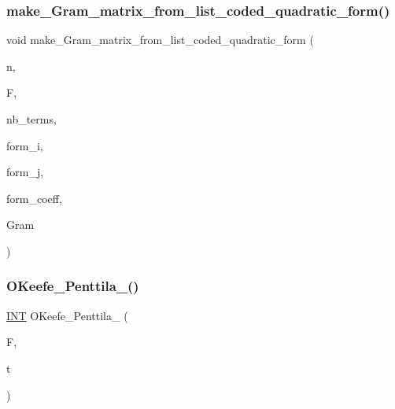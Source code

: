 \subsubsection{\texorpdfstring{make\+\_\+\+Gram\+\_\+matrix\+\_\+from\+\_\+list\+\_\+coded\+\_\+quadratic\+\_\+form()}{make\_Gram\_matrix\_from\_list\_coded\_quadratic\_form()}}
{\footnotesize\ttfamily void make\+\_\+\+Gram\+\_\+matrix\+\_\+from\+\_\+list\+\_\+coded\+\_\+quadratic\+\_\+form (\begin{DoxyParamCaption}\item[{\mbox{\hyperlink{galois_8h_a09fddde158a3a20bd2dcadb609de11dc}{I\+NT}}}]{n,  }\item[{\mbox{\hyperlink{classfinite__field}{finite\+\_\+field}} \&}]{F,  }\item[{\mbox{\hyperlink{galois_8h_a09fddde158a3a20bd2dcadb609de11dc}{I\+NT}}}]{nb\+\_\+terms,  }\item[{\mbox{\hyperlink{galois_8h_a09fddde158a3a20bd2dcadb609de11dc}{I\+NT}} $\ast$}]{form\+\_\+i,  }\item[{\mbox{\hyperlink{galois_8h_a09fddde158a3a20bd2dcadb609de11dc}{I\+NT}} $\ast$}]{form\+\_\+j,  }\item[{\mbox{\hyperlink{galois_8h_a09fddde158a3a20bd2dcadb609de11dc}{I\+NT}} $\ast$}]{form\+\_\+coeff,  }\item[{\mbox{\hyperlink{galois_8h_a09fddde158a3a20bd2dcadb609de11dc}{I\+NT}} $\ast$}]{Gram }\end{DoxyParamCaption})}

\mbox{\label{data_8_c_a30ac3b374e7cac53bd723d0826457ddf}} 
\subsubsection{\texorpdfstring{O\+Keefe\+\_\+\+Penttila\+\_()}{OKeefe\_Penttila\_32()}}
{\footnotesize\ttfamily \mbox{\hyperlink{galois_8h_a09fddde158a3a20bd2dcadb609de11dc}{I\+NT}} O\+Keefe\+\_\+\+Penttila\+\_ (\begin{DoxyParamCaption}\item[{\mbox{\hyperlink{classfinite__field}{finite\+\_\+field}} $\ast$}]{F,  }\item[{\mbox{\hyperlink{galois_8h_a09fddde158a3a20bd2dcadb609de11dc}{I\+NT}}}]{t }\end{DoxyParamCaption})}

